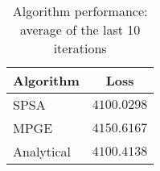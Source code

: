 \begin{table}[H]
    \centering
    \begin{tabular}{lc}
    \toprule
    \textbf{Algorithm} & \textbf{Loss} \\
    \midrule
    SPSA & $4100.0298$ \\
MPGE & $4150.6167$ \\
Analytical & $4100.4138$ \\
\bottomrule
    \end{tabular}
    \caption{Algorithm performance: average of the last 10 iterations}
    \end{table}